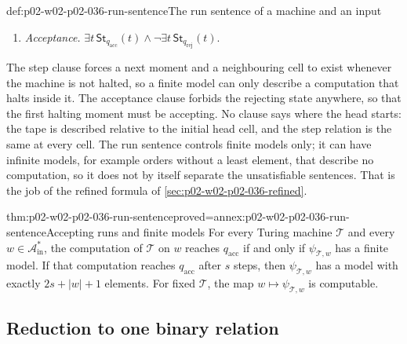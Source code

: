 \begin{hbdefinition}{def:p02-w02-p02-036-run-sentence}{The run sentence of a machine and an input}
\begin{enumerate}
  and \(a\in\mathcal A_{\mathrm{tape}}\) with \(\delta(q,a)=(q',b,d)\), the
  sentence
  \[
  \begin{aligned}
   \forall t\,\forall p\,\Bigl(&(\mathsf{St}_q(t)\land\mathsf{Hd}(t,p)\land
     \mathsf{Cl}_a(t,p))\to
     \exists t'\,\exists p'\,\bigl(\mathsf{Nx}(t,t')\land
     \mathsf{Mv}_d(p,p')\\
   &\land\mathsf{St}_{q'}(t')\land\mathsf{Hd}(t',p')\land\mathsf{Cl}_b(t',p)\\
   &\land\forall u\,\bigl(u\neq p\to\textstyle\bigwedge_{c\in\mathcal A_{\mathrm{tape}}}
     (\mathsf{Cl}_c(t,u)\to\mathsf{Cl}_c(t',u))\bigr)\bigr)\Bigr).
  \end{aligned}
  \]
\item \emph{Acceptance.} \(\exists t\,\mathsf{St}_{q_{\mathrm{acc}}}(t)\land
  \neg\exists t\,\mathsf{St}_{q_{\mathrm{rej}}}(t)\).
\end{enumerate}
\end{hbdefinition}

The step clause forces a next moment and a neighbouring cell to exist
whenever the machine is not halted, so a finite model can only describe a
computation that halts inside it.  The acceptance clause forbids the rejecting
state anywhere, so that the first halting moment must be accepting.  No
clause says where the head starts: the tape is described relative to the
initial head cell, and the step relation is the same at every cell.  The run
sentence controls finite models only; it can have infinite models, for
example orders without a least element, that describe no computation, so it
does not by itself separate the unsatisfiable sentences.  That is the job of
the refined formula of \cref{sec:p02-w02-p02-036-refined}.

\begin{hblemma}{thm:p02-w02-p02-036-run-sentence}{proved=annex:p02-w02-p02-036-run-sentence}{Accepting runs and finite models}
For every Turing machine \(\mathcal T\) and every
\(w\in\mathcal A_{\mathrm{in}}^*\), the computation of \(\mathcal T\) on \(w\)
reaches \(q_{\mathrm{acc}}\) if and only if \(\psi_{\mathcal T,w}\) has a finite
model.  If that computation reaches \(q_{\mathrm{acc}}\) after \(s\) steps, then
\(\psi_{\mathcal T,w}\) has a model with exactly \(2s+\lvert w\rvert+1\)
elements.  For fixed \(\mathcal T\), the map \(w\mapsto\psi_{\mathcal T,w}\) is
computable.
\end{hblemma}

\subsection{Reduction to one binary relation}
\label{sec:p02-w02-p02-036-one-binary}

